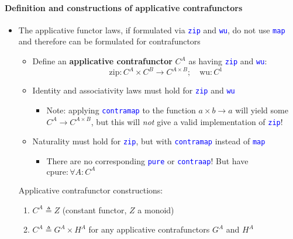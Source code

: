 \paragraph{Definition and constructions of applicative contrafunctors}
\begin{itemize}
\item \vspace{-0.25cm}The applicative functor laws, if formulated via \texttt{\textcolor{blue}{\footnotesize{}zip}}
and \texttt{\textcolor{blue}{\footnotesize{}wu}}, do not use \texttt{\textcolor{blue}{\footnotesize{}map}}
and therefore can be formulated for contrafunctors
\begin{itemize}
\item Define an \textbf{applicative contrafunctor} $C^{A}$ as having \texttt{\textcolor{blue}{\footnotesize{}zip}}
and \texttt{\textcolor{blue}{\footnotesize{}wu}}:{\footnotesize{}
\[
\text{zip}:C^{A}\times C^{B}\rightarrow C^{A\times B};\quad\text{wu}:C^{1}
\]
}{\footnotesize\par}
\item Identity and associativity laws must hold for \texttt{\textcolor{blue}{\footnotesize{}zip}}
and \texttt{\textcolor{blue}{\footnotesize{}wu}} 
\begin{itemize}
\item Note: applying \texttt{\textcolor{blue}{\footnotesize{}contramap}}
to the function $a\times b\rightarrow a$ will yield some $C^{A}\rightarrow C^{A\times B}$,
but this will \emph{not} give a valid implementation of \texttt{\textcolor{blue}{\footnotesize{}zip}}!
\end{itemize}
\item Naturality must hold for \texttt{\textcolor{blue}{\footnotesize{}zip}},
but with \texttt{\textcolor{blue}{\footnotesize{}contramap}} instead
of \texttt{\textcolor{blue}{\footnotesize{}map}} 
\begin{itemize}
\item There are no corresponding \texttt{\textcolor{blue}{\footnotesize{}pure}}
or \texttt{\textcolor{blue}{\footnotesize{}contraap}}! But have $\text{cpure}:\forall A:C^{A}$
\end{itemize}
\end{itemize}
Applicative contrafunctor constructions:
\begin{enumerate}
\item $C^{A}\triangleq Z$ (constant functor, $Z$ a monoid)
\item $C^{A}\triangleq G^{A}\times H^{A}$ for any applicative contrafunctors
$G^{A}$ and $H^{A}$

\end{enumerate}
\end{itemize}
